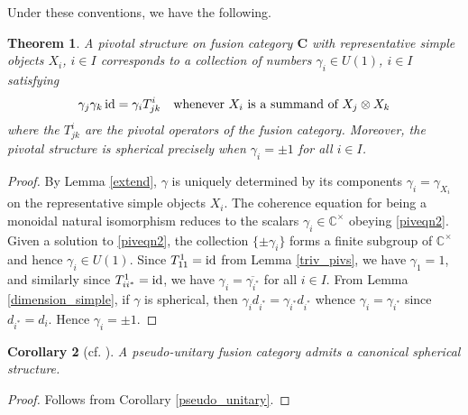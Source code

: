 \documentclass[a4paper]{article}
\theoremstyle{plain}
\newtheorem{thm}{Theorem}[section]
\newtheorem{cor}[thm]{Corollary}
\theoremstyle{definition}
\newcommand\id{\operatorname{\text{\rm id}}}
\newcommand{\cat}{\mathbf}
\begin{document}
Under these conventions, we have the following.

\begin{thm} A pivotal structure on fusion category $\cat{C}$ with representative simple objects $X_i$, $i \in I$ corresponds to a collection of numbers $\gamma_i \in U(1)$, $i \in I$ satisfying
\begin{equation} \label{piveqn2}
 \gamma_j \gamma_k \id = \gamma_i T^i_{jk} \quad \text{whenever $X_i$ is a summand of $X_j \otimes X_k$} 
\end{equation}
where the $T^i_{jk}$ are the pivotal operators of the fusion category. Moreover, the pivotal structure is spherical precisely when $\gamma_i = \pm 1$ for all $i \in I$. \label{piv_structure_thm}
\end{thm}
\begin{proof}
By Lemma \ref{extend}, $\gamma$ is uniquely determined by its components $\gamma_i = \gamma_{X_i}$ on the representative simple objects $X_i$. The coherence equation for being a monoidal natural isomorphism reduces to the scalars $\gamma_i \in \mathbb{C}^\times$ obeying \eqref{piveqn2}. Given a solution to \eqref{piveqn2}, the collection $\{ \pm \gamma_i\}$ forms a finite subgroup of $\mathbb{C}^\times$ and hence $\gamma_i \in U(1)$.  Since $T^1_{11} = \id$ from Lemma \ref{triv_pivs}, we have $\gamma_1 = 1$, and similarly since $T^1_{ii^*} = \id$, we have $\gamma_i = \overline{\gamma_{i^*}}$ for all $i \in I$. From Lemma \ref{dimension_simple}, if $\gamma$ is spherical, then $\gamma_i d_{i^*} = \gamma_{i^*} d_{i^*}$ whence $\gamma_i = \gamma_{i^*}$ since $d_{i^*} = d_i$. Hence $\gamma_i = \pm 1$.  
\end{proof}
\begin{cor}[{cf. \cite[Prop 8.23]{eno02-ofc}}] A pseudo-unitary fusion category admits a canonical spherical structure. \label{pseudo_cor}
\end{cor}
\begin{proof}
Follows from Corollary \ref{pseudo_unitary}.
\end{proof}
\end{document}
